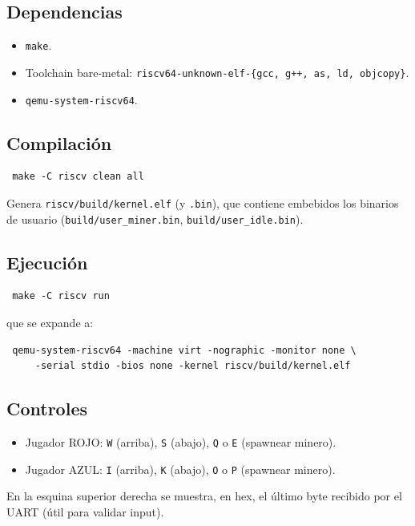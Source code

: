 \subsection{Dependencias}

\begin{itemize}
  \item \texttt{make}.
  \item Toolchain bare-metal: \texttt{riscv64-unknown-elf-\{gcc, g++, as, ld, objcopy\}}.
  \item \texttt{qemu-system-riscv64}.
\end{itemize}

\subsection{Compilación}

\begin{codesnippet}
\begin{verbatim}
 make -C riscv clean all
\end{verbatim}
\end{codesnippet}

Genera \texttt{riscv/build/kernel.elf} (y \texttt{.bin}), que contiene embebidos los binarios de usuario
(\texttt{build/user\_miner.bin}, \texttt{build/user\_idle.bin}).

\subsection{Ejecución}

\begin{codesnippet}
\begin{verbatim}
 make -C riscv run
\end{verbatim}
\end{codesnippet}

que se expande a:

\begin{codesnippet}
\begin{verbatim}
 qemu-system-riscv64 -machine virt -nographic -monitor none \
     -serial stdio -bios none -kernel riscv/build/kernel.elf
\end{verbatim}
\end{codesnippet}

\subsection{Controles}

\begin{itemize}
  \item Jugador ROJO: \texttt{W} (arriba), \texttt{S} (abajo), \texttt{Q} o \texttt{E} (spawnear minero).
  \item Jugador AZUL: \texttt{I} (arriba), \texttt{K} (abajo), \texttt{O} o \texttt{P} (spawnear minero).
\end{itemize}

En la esquina superior derecha se muestra, en hex, el último byte recibido por el UART (útil para validar input).
